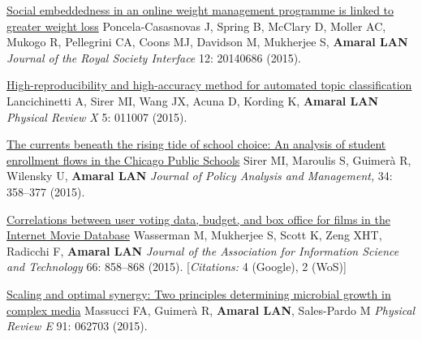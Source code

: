 \NumberedItem{\makebox[0.8cm][r]{[114]}}
\href{/people/amaral/social-embeddedness-online-weight-management-programme-linked-greater-weight-loss}
{Social embeddedness in an online weight management programme is linked to greater weight loss}
\newline
Poncela-Casasnovas J, Spring B, McClary D, Moller AC, Mukogo R, Pellegrini CA, Coons MJ, Davidson M, Mukherjee S, {\textbf{Amaral LAN}}
\newline
\textit{Journal of the Royal Society Interface}
    12:
20140686 (2015).
\newline
\Gap
~
\Gap

\NumberedItem{\makebox[0.8cm][r]{[113]}}
\href{/people/amaral/high-reproducibility-and-high-accuracy-method-automated-topic-classification}
{High-reproducibility and high-accuracy method for automated topic classification}
\newline
Lancichinetti A, Sirer MI, Wang JX, Acuna D, Kording K, {\textbf{Amaral LAN}}
\newline
\textit{Physical Review X}
    5:
011007 (2015).
\newline
\Gap
~
\Gap

\NumberedItem{\makebox[0.8cm][r]{[112]}}
\href{/people/amaral/currents-beneath-rising-tide-school-choice-analysis-student-enrollment-flows-chicago-public-schools}
{The currents beneath the rising tide of school choice: An analysis of student enrollment flows in the Chicago Public Schools}
\newline
Sirer MI, Maroulis S, Guimer\`a R, Wilensky U, {\textbf{Amaral LAN}}
\newline
\textit{Journal of Policy Analysis and Management,}
    34:
358--377 (2015).
\newline
\Gap
~
\Gap

\NumberedItem{\makebox[0.8cm][r]{[111]}}
\href{/people/amaral/correlations-between-user-voting-data-budget-and-box-office-films-internet-movie-database}
{Correlations between user voting data, budget, and box office for films in the Internet Movie Database}
\newline
Wasserman M, Mukherjee S, Scott K, Zeng XHT, Radicchi F, {\textbf{Amaral LAN}}
\newline
\textit{Journal of the Association for Information Science and Technology}
    66:
858--868 (2015).
    [{\em{Citations:}} 4 (Google), 2 (WoS)]
\newline
\Gap
~
\Gap

\NumberedItem{\makebox[0.8cm][r]{[110]}}
\href{/people/amaral/scaling-and-optimal-synergy-two-principles-determining-microbial-growth-complex-media}
{Scaling and optimal synergy: Two principles determining microbial growth in complex media}
\newline
Massucci FA, Guimer\`a R, {\textbf{Amaral LAN}}, Sales-Pardo M
\newline
\textit{Physical Review E}
    91:
062703 (2015).
\newline
\Gap
~
\Gap

